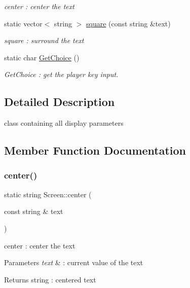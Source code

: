 \begin{DoxyCompactItemize}
\begin{DoxyCompactList}\small\item\em center \+: center the text \end{DoxyCompactList}\item 
static vector$<$ string $>$ \hyperlink{class_screen_acfa6f40ddcae5ffd314f5c62e805f042}{square} (const string \&text)
\begin{DoxyCompactList}\small\item\em square \+: surround the text \end{DoxyCompactList}\item 
static char \hyperlink{class_screen_adfa61a8f109d355e1b9cd8f4f07ecd02}{Get\+Choice} ()
\begin{DoxyCompactList}\small\item\em Get\+Choice \+: get the player key input. \end{DoxyCompactList}\end{DoxyCompactItemize}


\subsection{Detailed Description}
class containing all display parameters 

\subsection{Member Function Documentation}
\mbox{\label{class_screen_a4e9f61880e53dbb68d7bc6a684f4e779}} 
\subsubsection{\texorpdfstring{center()}{center()}}
{\footnotesize\ttfamily static string Screen\+::center (\begin{DoxyParamCaption}\item[{const string \&}]{text }\end{DoxyParamCaption})\hspace{0.3cm}{\ttfamily [static]}}



center \+: center the text 


\begin{DoxyParams}{Parameters}
{\em text} & \+: current value of the text \\
\hline
\end{DoxyParams}
\begin{DoxyReturn}{Returns}
string \+: centered text 
\end{DoxyReturn}
\mbox{\label{class_screen_a9b42301ad973ab952895ef1c3f2ca172}} 
